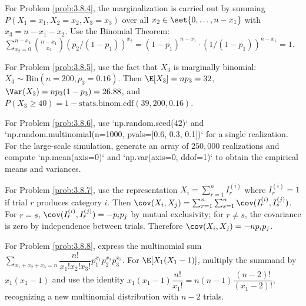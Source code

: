\begin{sugerencia}
	\label{sug:3.8.4}
	For Problem \ref{prob:3.8.4}, the marginalization is carried out by summing $P(X_{1} = x_{1}, X_{2} = x_{2}, X_{3} = x_{3})$ over all $x_{2} \in \set{0, \dots, n - x_{1}}$ with $x_{3} = n - x_{1} - x_{2}$. Use the Binomial Theorem: $\sum_{x_{2}=0}^{n-x_{1}} \binom{n - x_{1}}{x_{2}} (p_{2}/(1-p_{1}))^{x_{2}} = (1-p_{1})^{n-x_{1}} \cdot (1/(1-p_{1}))^{n-x_{1}} = 1$.
\end{sugerencia}

\begin{sugerencia}
	\label{sug:3.8.5}
	For Problem \ref{prob:3.8.5}, use the fact that $X_{3}$ is marginally binomial: $X_{3} \sim \text{Bin}(n = 200, p_{3} = 0.16)$. Then $\E[X_{3}] = np_{3} = 32$, $\Var(X_{3}) = np_{3}(1-p_{3}) = 26.88$, and $P(X_{3} \ge 40) = 1 - \text{stats.binom.cdf}(39, 200, 0.16)$.
\end{sugerencia}

\begin{sugerencia}
	\label{sug:3.8.6}
	For Problem \ref{prob:3.8.6}, use `np.random.seed(42)` and `np.random.multinomial(n=1000, pvals=[0.6, 0.3, 0.1])` for a single realization. For the large-scale simulation, generate an array of $250{,}000$ realizations and compute `np.mean(axis=0)` and `np.var(axis=0, ddof=1)` to obtain the empirical means and variances.
\end{sugerencia}

\begin{sugerencia}
	\label{sug:3.8.7}
	For Problem \ref{prob:3.8.7}, use the representation $X_{i} = \sum_{r=1}^{n} I_{r}^{(i)}$ where $I_{r}^{(i)} = 1$ if trial $r$ produces category $i$. Then $\cov(X_{i}, X_{j}) = \sum_{r=1}^{n} \sum_{s=1}^{n} \cov(I_{r}^{(i)}, I_{s}^{(j)})$. For $r = s$, $\cov(I_{r}^{(i)}, I_{r}^{(j)}) = -p_{i} p_{j}$ by mutual exclusivity; for $r \neq s$, the covariance is zero by independence between trials. Therefore $\cov(X_{i}, X_{j}) = -n p_{i} p_{j}$.
\end{sugerencia}

\begin{sugerencia}
	\label{sug:3.8.8}
	For Problem \ref{prob:3.8.8}, express the multinomial sum $\sum_{x_{1}+x_{2}+x_{3}=n} \dfrac{n!}{x_{1}! x_{2}! x_{3}!} p_{1}^{x_{1}} p_{2}^{x_{2}} p_{3}^{x_{3}}$. For $\E[X_{1}(X_{1}-1)]$, multiply the summand by $x_{1}(x_{1}-1)$ and use the identity $x_{1}(x_{1}-1) \dfrac{n!}{x_{1}!} = n(n-1) \dfrac{(n-2)!}{(x_{1}-2)!}$, recognizing a new multinomial distribution with $n-2$ trials.
\end{sugerencia}

